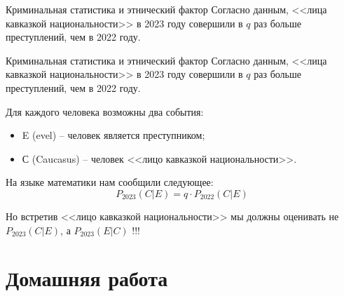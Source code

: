 \begin{frame}[fragile,t]{Криминальная статистика и этнический фактор}
\footnotesize
Согласно данным, <<лица кавказкой национальности>> в 2023 году совершили 
в $q$ раз больше преступлений, чем в 2022 году.

	
	
\end{frame}


\begin{frame}[fragile,t]{Криминальная статистика и этнический фактор}
\footnotesize
Согласно данным, <<лица кавказкой национальности>> в 2023 году совершили 
в $q$ раз больше преступлений, чем в 2022 году.

	
Для каждого человека возможны два события:
\begin{itemize}
	\item E (evel) -- человек является преступником;
	\item С (Caucasus) -- человек <<лицо кавказкой национальности>>.
\end{itemize}

На языке математики нам сообщили следующее:
\begin{equation}
P_{2023}(C|E) = q \cdot P_{2022}(C|E)
\end{equation}

Но встретив <<лицо кавказкой национальности>> мы должны оценивать 
не $P_{2023}(C|E)$, а $P_{2023}(E|C)$ !!!

	
\end{frame}


\section{Домашняя работа}



